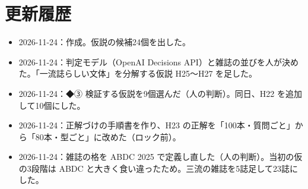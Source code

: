\documentclass[a4paper,10pt]{ltjsarticle}
\begin{document}
\section*{更新履歴}
\begin{itemize}
  \item 2026-11-24：作成。仮説の候補24個を出した。
  \item 2026-11-24：判定モデル（OpenAI Decisions API）と雑誌の並びを人が決めた。「一流誌らしい文体」を分解する仮説 H25〜H27 を足した。
  \item 2026-11-24：◆③ 検証する仮説を9個選んだ（人の判断）。同日、H22 を追加して10個にした。
  \item 2026-11-24：正解づけの手順書を作り、H23 の正解を「100本・質問ごと」から「80本・型ごと」に改めた（ロック前）。
  \item 2026-11-24：雑誌の格を ABDC 2025 で定義し直した（人の判断）。当初の仮の3段階は ABDC と大きく食い違ったため。三流の雑誌を5誌足して23誌にした。
\end{itemize}

\printbibliography[title={参考文献}]
\end{document}
